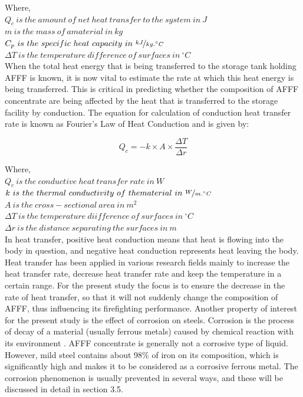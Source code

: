 \documentclass[12pt]{report}
\begin{document}
\noindent Where, \\
$Q_c\ is\ the\ amount\ of\ net\ heat\ transfer\ to\ the\ system\ in\ J$ \\
$m\ is\ the\ mass\ of\ amaterial\ in\ kg$ \\
$C_p\ is\ the\ specific\ heat\ capacity\ in\ \nicefrac{kJ}{kg.^\circ C}$ \\
$\Delta T\ is\ the\ temperature\ difference\ of\ surfaces\ in\ ^\circ C$ \\

When the total heat energy that is being transferred to the storage tank holding AFFF is known, it is now vital to estimate the rate at which this heat energy is being transferred. This is critical in predicting whether the composition of AFFF concentrate are being affected by the heat that is transferred to the storage facility by conduction. The equation for calculation of conduction heat transfer rate is known as Fourier’s Law of Heat Conduction and is given by:

\begin{equation}
    Q_c = -k \times A \times \frac{\Delta T}{\Delta r}
\end{equation}

\noindent Where, \\
$Q_c\ is\ the\ conductive\ heat\ transfer\ rate\ in\ W$ \\
$k\ is\ the\ thermal\ conductivity\ of\ thematerial\ in\ \nicefrac{W}{m.^\circ C}$ \\
$A\ is\ the\ cross-sectional\ area\ in\ m^2$ \\
$\Delta T\ is\ the\ temperature\ diifference\ of\ surfaces\ in\ ^\circ C$ \\
$\Delta r\ is\ the\ distance\ separating\ the\ surfaces\ in\ m$ \\

In heat transfer, positive heat conduction means that heat is flowing into the body in question, and negative heat conduction represents heat leaving the body. Heat transfer has been applied in various research fields mainly to increase the heat transfer rate, decrease heat transfer rate and keep the temperature in a certain range. For the present study the focus is to ensure the decrease in the rate of heat transfer, so that it will not suddenly change the composition of AFFF, thus influencing its firefighting performance.  
Another property of interest for the present study is the effect of corrosion on steels. Corrosion is the process of decay of a material (usually ferrous metals) caused by chemical reaction with its environment \cite{islam2018effects}. AFFF concentrate is generally not a corrosive type of liquid. However, mild steel contains about 98\% of iron on its composition, which is significantly high and makes it to be considered as a corrosive ferrous metal.  The corrosion phenomenon is usually prevented in several ways, and these will be discussed in detail in section 3.5.
\end{document}
